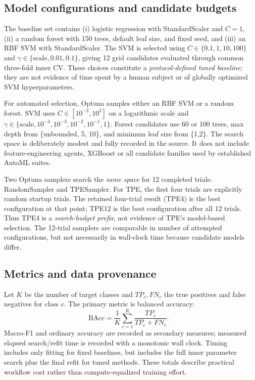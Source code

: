 \documentclass[11pt,a4paper]{article}
\begin{document}
\subsection{Model configurations and candidate budgets}
The baseline set contains (i) logistic regression with StandardScaler and $C=1$, (ii) a random forest with 150 trees, default leaf size, and fixed seed, and (iii) an RBF SVM with StandardScaler. The SVM is selected using $C\in\{0.1,1,10,100\}$ and $\gamma\in\{\mathrm{scale},0.01,0.1\}$, giving 12 grid candidates evaluated through common three-fold inner CV. These choices constitute a \emph{protocol-defined tuned baseline}; they are not evidence of time spent by a human subject or of globally optimized SVM hyperparameters.

For automated selection, Optuna samples either an RBF SVM or a random forest. SVM uses $C\in[10^{-2},10^{3}]$ on a logarithmic scale and $\gamma\in\{\mathrm{scale},10^{-4},10^{-3},10^{-2},10^{-1},1\}$. Forest candidates use 60 or 100 trees, max depth from \{unbounded, 5, 10\}, and minimum leaf size from \{1,2\}. The search space is deliberately modest and fully recorded in the source. It does not include feature-engineering agents, XGBoost or all candidate families used by established AutoML suites.

Two Optuna samplers search the \emph{same space} for 12 completed trials: RandomSampler and TPESampler. For TPE, the first four trials are explicitly random startup trials. The retained four-trial result (TPE4) is the best configuration at that point; TPE12 is the best configuration after all 12 trials. Thus TPE4 is a \emph{search-budget prefix}, not evidence of TPE's model-based selection. The 12-trial samplers are comparable in number of attempted configurations, but not necessarily in wall-clock time because candidate models differ.

\subsection{Metrics and data provenance}
Let $K$ be the number of target classes and $TP_c,FN_c$ the true positives and false negatives for class $c$. The primary metric is balanced accuracy:
\begin{equation}
\mathrm{BAcc}=\frac{1}{K}\sum_{c=1}^{K}\frac{TP_c}{TP_c+FN_c}.
\end{equation}
Macro-F1 and ordinary accuracy are recorded as secondary measures; measured elapsed search/refit time is recorded with a monotonic wall clock. Timing includes only fitting for fixed baselines, but includes the full inner parameter search plus the final refit for tuned methods. These totals describe practical workflow cost rather than compute-equalized training effort.
\end{document}
